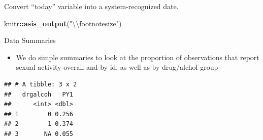 \documentclass[ignorenonframetext,]{beamer}
\newenvironment{Shaded}{\begin{snugshade}}{\end{snugshade}}
\newcommand{\KeywordTok}[1]{\textcolor[rgb]{0.13,0.29,0.53}{\textbf{#1}}}
\newcommand{\DataTypeTok}[1]{\textcolor[rgb]{0.13,0.29,0.53}{#1}}
\newcommand{\DecValTok}[1]{\textcolor[rgb]{0.00,0.00,0.81}{#1}}
\newcommand{\CharTok}[1]{\textcolor[rgb]{0.31,0.60,0.02}{#1}}
\newcommand{\StringTok}[1]{\textcolor[rgb]{0.31,0.60,0.02}{#1}}
\newcommand{\CommentTok}[1]{\textcolor[rgb]{0.56,0.35,0.01}{\textit{#1}}}
\newcommand{\OperatorTok}[1]{\textcolor[rgb]{0.81,0.36,0.00}{\textbf{#1}}}
\newcommand{\NormalTok}[1]{#1}
\providecommand{\tightlist}{%
  \setlength{\itemsep}{0pt}\setlength{\parskip}{0pt}}
\begin{document}
\begin{frame}[fragile]{Convert ``today'' variable into a
system-recognized date.}

\begin{Shaded}
\begin{Highlighting}[]
\NormalTok{knitr}\OperatorTok{::}\KeywordTok{asis_output}\NormalTok{(}\StringTok{"}\CharTok{\textbackslash{}\textbackslash{}}\StringTok{footnotesize"}\NormalTok{)}
\end{Highlighting}
\end{Shaded}

\footnotesize

\begin{Shaded}
\end{Shaded}

\end{frame}

\begin{frame}[fragile]{Data Summaries}

\begin{itemize}
\tightlist
\item
  We do simple summaries to look at the proportion of observations that
  report sexual activity overall and by id, as well as by drug/alchol
  group
\end{itemize}

\tiny

\begin{verbatim}
## # A tibble: 3 x 2
##   drgalcoh   PY1
##      <int> <dbl>
## 1        0 0.256
## 2        1 0.374
## 3       NA 0.055
\end{verbatim}

\end{frame}
\end{document}
